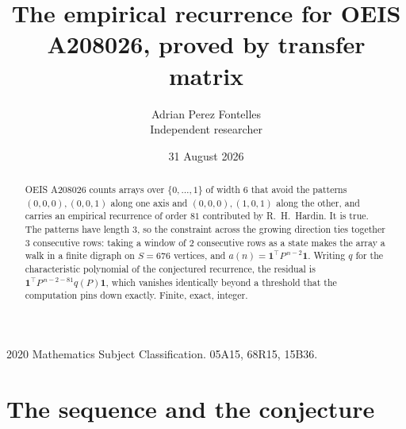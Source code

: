 \documentclass[11pt,a4paper]{article}
\title{The empirical recurrence for OEIS A208026, proved by transfer matrix}
\author{Adrian Perez Fontelles\\ \small Independent researcher}
\date{31 August 2026}
\theoremstyle{plain}
\theoremstyle{definition}
\begin{document}
\maketitle

\begin{abstract}
OEIS A208026 counts arrays over $\{0,\dots,1\}$ of width $6$ that avoid the patterns
$(0,0,0), (0,0,1)$ along one axis and $(0,0,0), (1,0,1)$ along the other, and carries an empirical recurrence of
order $81$ contributed by R.~H.~Hardin. It is true. The patterns have length $3$, so
the constraint across the growing direction ties together $3$ consecutive rows: taking a
window of $2$ consecutive rows as a state makes the array a walk in a finite digraph
on $S=676$ vertices, and $a(n)=\mathbf{1}^{\!\top}P^{\,n-2}\mathbf{1}$. Writing $q$
for the characteristic polynomial of the conjectured recurrence, the residual is
$\mathbf{1}^{\!\top}P^{\,n-2-81}q(P)\mathbf{1}$, which vanishes identically
beyond a threshold that the computation pins down exactly. Finite, exact, integer.
\end{abstract}

\noindent\small 2020 Mathematics Subject Classification. 05A15, 68R15, 15B36.\normalsize

\section{The sequence and the conjecture}
\end{document}
